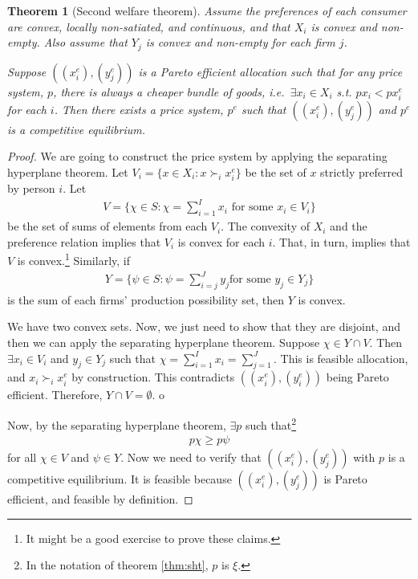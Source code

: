 \documentclass[12pt,reqno]{amsart}
\newtheorem{theorem}{Theorem}[section]
\theoremstyle{definition}
\newcommand{\pref}{\succ}
\begin{document}
\begin{theorem}[Second welfare theorem]
  Assume the preferences of each consumer are convex, locally
  non-satiated, and continuous, and that $X_i$ is convex and
  non-empty.  
  Also assume that $Y_j$ is convex and non-empty for each
  firm $j$. 

  Suppose $((x_i^e), (y_j^e))$ is a Pareto efficient allocation such
  that for any price system, $p$, there is always a cheaper bundle of
  goods, i.e.\ $\exists x_i \in X_i$ s.t. $p x_i < p x_i^e$ for each
  $i$. Then there exists a price system, $p^e$ such that $((x_i^e),
  (y_j^e))$ and $p^e$ is a competitive equilibrium.
\end{theorem}
\begin{proof}
  We are going to construct the price system by applying the
  separating hyperplane theorem. Let $V_i = \{ x \in X_i : x \pref_i
  x_i^e \}$ be the set of $x$ strictly preferred by person $i$. Let 
  \begin{align*}
    V = \{ \chi \in S: \chi = \sum_{i=1}^I x_i \text{ for some } x_i
    \in V_i \}  
  \end{align*}
  be the set of sums of elements from each $V_i$. The convexity of
  $X_i$ and the preference relation implies that $V_i$ is convex for
  each $i$. That, in turn, implies that $V$ is convex.\footnote{It
    might be a good exercise to prove these claims. } 
  Similarly, if 
  \begin{align*}
    Y = \{ \psi \in S: \psi = \sum_{i=j}^J y_j \text{
      for some } y_j \in Y_j \}  
  \end{align*}
  is the sum of each firms' production possibility set, then $Y$ is
  convex. 

  We have two convex sets. Now, we just need to show that they are
  disjoint, and then we can apply the separating hyperplane
  theorem. Suppose $\chi \in Y \cap V$. Then $\exists x_i \in V_i$ and
  $y_j \in Y_j$ such that $\chi = \sum_{i=1}^I x_i = \sum_{j=1}^J$. This
  is feasible allocation, and $x_i \pref_i x_i^e$ by
  construction. This contradicts $((x_i^e),(y_i^e))$ being Pareto
  efficient. Therefore, $Y \cap V = \emptyset$. o

  Now, by the separating hyperplane theorem, $\exists p$ such
  that\footnote{In the notation of theorem \ref{thm:sht}, $p$ is $\xi$.}
  \begin{align}
    p \chi \geq p \psi \label{ieq:p}
  \end{align}
  for all $\chi \in V$ and $\psi \in Y$. Now we need to verify
  that $((x_i^e),(y_j^e))$ with $p$ is a competitive equilibrium. It
  is feasible because $((x_i^e),(y_j^e))$ is Pareto efficient, and
  feasible by definition.
  

\end{proof}
\end{document}
